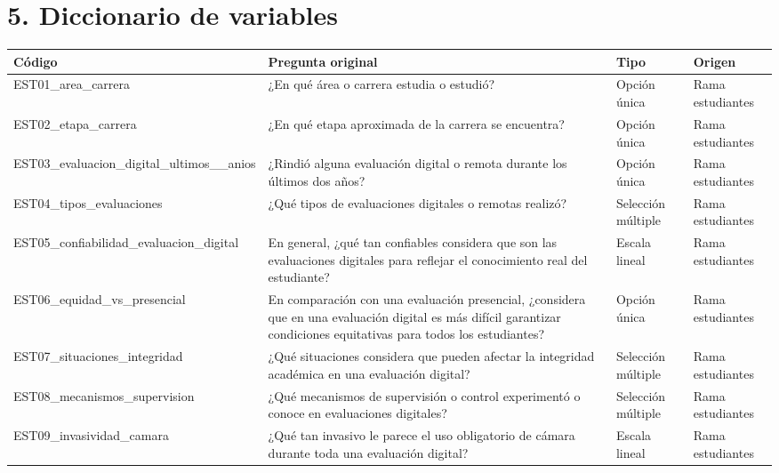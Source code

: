 \section*{5. Diccionario de variables}
\begin{center}\footnotesize
\begin{longtable}{@{}p{3.4cm}p{3.7cm}p{3.7cm}p{3.7cm}@{}}
\toprule
\rowcolor{accent!15}\textbf{Código} & \textbf{Pregunta original} & \textbf{Tipo} & \textbf{Origen} \\
\midrule\endhead
EST01\_\allowbreak area\_\allowbreak carrera & ¿En qué área o carrera estudia o estudió? & Opción única & Rama estudiantes \\
EST02\_\allowbreak etapa\_\allowbreak carrera & ¿En qué etapa aproximada de la carrera se encuentra? & Opción única & Rama estudiantes \\
EST03\_\allowbreak evaluacion\_\allowbreak digital\_\allowbreak ultimos\_\allowbreak 2\_\allowbreak anios & ¿Rindió alguna evaluación digital o remota durante los últimos dos años? & Opción única & Rama estudiantes \\
EST04\_\allowbreak tipos\_\allowbreak evaluaciones & ¿Qué tipos de evaluaciones digitales o remotas realizó? & Selección múltiple & Rama estudiantes \\
EST05\_\allowbreak confiabilidad\_\allowbreak evaluacion\_\allowbreak digital & En general, ¿qué tan confiables considera que son las evaluaciones digitales para reflejar el conocimiento real del estudiante? & Escala lineal & Rama estudiantes \\
EST06\_\allowbreak equidad\_\allowbreak vs\_\allowbreak presencial & En comparación con una evaluación presencial, ¿considera que en una evaluación digital es más difícil garantizar condiciones equitativas para todos los estudiantes? & Opción única & Rama estudiantes \\
EST07\_\allowbreak situaciones\_\allowbreak integridad & ¿Qué situaciones considera que pueden afectar la integridad académica en una evaluación digital? & Selección múltiple & Rama estudiantes \\
EST08\_\allowbreak mecanismos\_\allowbreak supervision & ¿Qué mecanismos de supervisión o control experimentó o conoce en evaluaciones digitales? & Selección múltiple & Rama estudiantes \\
EST09\_\allowbreak invasividad\_\allowbreak camara & ¿Qué tan invasivo le parece el uso obligatorio de cámara durante toda una evaluación digital? & Escala lineal & Rama estudiantes \\

\end{longtable}
\end{center}
